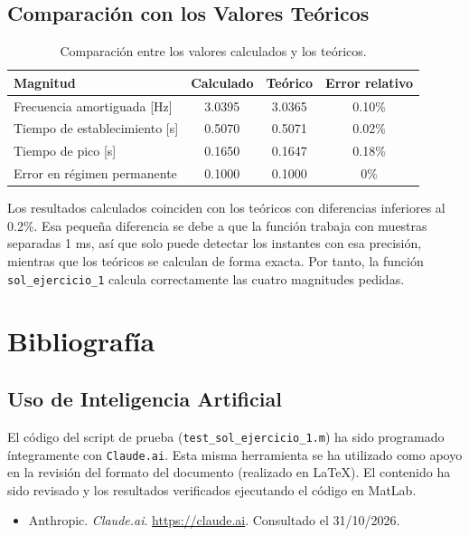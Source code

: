 \documentclass[12pt,a4paper]{article}
\let\oldsection\section
\renewcommand{\section}{\clearpage\oldsection}
\newcommand{\codigo}[1]{\colorbox{bgcmd}{\texttt{#1}}}
\begin{document}
\subsection{Comparación con los Valores Teóricos}

\begin{table}[H]
  \centering
  \begin{tabular}{lccc}
    \toprule
    \textbf{Magnitud} & \textbf{Calculado} & \textbf{Teórico} & \textbf{Error relativo} \\
    \midrule
    Frecuencia amortiguada [Hz]   & 3.0395 & 3.0365 & 0.10\% \\
    Tiempo de establecimiento [s] & 0.5070 & 0.5071 & 0.02\% \\
    Tiempo de pico [s]            & 0.1650 & 0.1647 & 0.18\% \\
    Error en régimen permanente   & 0.1000 & 0.1000 & 0\% \\
    \bottomrule
  \end{tabular}
  \caption{Comparación entre los valores calculados y los teóricos.}
\end{table}

Los resultados calculados coinciden con los teóricos con diferencias inferiores al 0.2\%. Esa pequeña diferencia se debe a que la función trabaja con muestras separadas 1 ms, así que solo puede detectar los instantes con esa precisión, mientras que los teóricos se calculan de forma exacta. Por tanto, la función \codigo{sol\_ejercicio\_1} calcula correctamente las cuatro magnitudes pedidas.

\section{Bibliografía}

\subsection{Uso de Inteligencia Artificial}

El código del script de prueba (\codigo{test\_sol\_ejercicio\_1.m}) ha sido programado íntegramente con \codigo{Claude.ai}. Esta misma herramienta se ha utilizado como apoyo en la revisión del formato del documento (realizado en LaTeX). El contenido ha sido revisado y los resultados verificados ejecutando el código en MatLab.

\begin{itemize}[label=$\bullet$]
  \item Anthropic. \textit{Claude.ai}. \href{https://claude.ai}{https://claude.ai}. Consultado el 31/10/2026.
\end{itemize}
\end{document}
